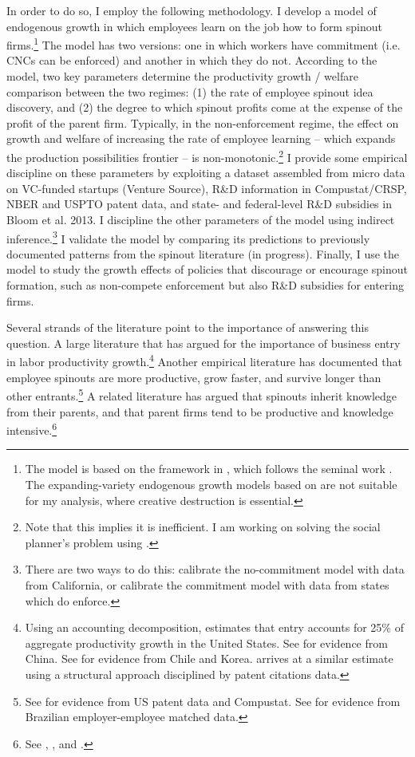 \documentclass[11pt,english]{article}
\theoremstyle{remark}
\begin{document}
In order to do so, I employ the following methodology. I develop a model of endogenous growth in which employees learn on the job how to form spinout firms.\footnote{The model is based on the framework in \cite{akcigit_growth_2018}, which follows the seminal work \cite{grossman_quality_1991}. The expanding-variety endogenous growth models based on \cite{romer_increasing_1986} are not suitable for my analysis, where creative destruction is essential.} The model has two versions: one in which workers have commitment (i.e. CNCs can be enforced) and another in which they do not. According to the model, two key parameters determine the productivity growth / welfare comparison between the two regimes: (1) the rate of employee spinout idea discovery, and (2) the degree to which spinout profits come at the expense of the profit of the parent firm. Typically, in the non-enforcement regime, the effect on growth and welfare of increasing the rate of employee learning -- which expands the production possibilities frontier -- is non-monotonic.\footnote{Note that this implies it is inefficient. I am working on solving the social planner's problem using \cite{nuno_social_2018}.} I provide some empirical discipline on these parameters by exploiting a dataset assembled from micro data on VC-funded startups (Venture Source), R\&D information in Compustat/CRSP, NBER and USPTO patent data, and state- and federal-level R\&D subsidies in Bloom et al. 2013. I discipline the other parameters of the model using indirect inference.\footnote{There are two ways to do this: calibrate the no-commitment model with data from California, or calibrate the commitment model with data from states which do enforce.} I validate the model by comparing its predictions to previously documented patterns from the spinout literature (in progress). Finally, I use the model to study the growth effects of policies that discourage or encourage spinout formation, such as non-compete enforcement but also R\&D subsidies for entering firms.

Several strands of the literature point to the importance of answering this question. A large literature that has argued for the importance of business entry in labor productivity growth.\footnote{Using an accounting decomposition, \cite{foster_aggregate_2001} estimates that entry accounts for 25\% of aggregate productivity growth in the United States. See \cite{brandt_creative_2012} for evidence from China. See \cite{asturias_firm_2019} for evidence from Chile and Korea. \cite{akcigit_growth_2018} arrives at a similar estimate using a structural approach disciplined by patent citations data.} Another empirical literature has documented that employee spinouts are more productive, grow faster, and survive longer than other entrants.\footnote{See \cite{baslandze_spinout_2019} for evidence from US patent data and Compustat. See \cite{muendler_employee_2012} for evidence from Brazilian employer-employee matched data.} A related literature has argued that spinouts inherit knowledge from their parents, and that parent firms tend to be productive and knowledge intensive.\footnote{See \cite{klepper_entry_2005}, \cite{gompers_entrepreneurial_2005}, and \cite{baslandze_spinout_2019}.} 
\end{document}

